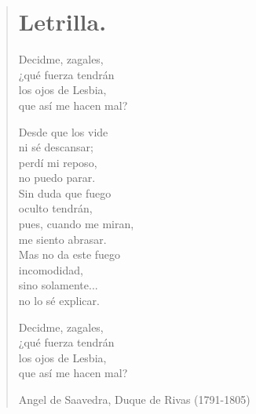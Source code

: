 \documentclass[12pt, twoside]{book}
\begin{document}
\newpage
\begin{verse}
\begin{center}
\section{Letrilla.}
\end{center}
Decidme, zagales,\\
¿qué fuerza tendrán\\
los ojos de Lesbia,\\
que así me hacen mal?
\newline

Desde que los vide\\
ni sé descansar;\\
perdí mi reposo,\\
no puedo parar.\\
Sin duda que fuego\\
oculto tendrán,\\
pues, cuando me miran,\\
me siento abrasar.\\
Mas no da este fuego \\
incomodidad,\\
sino solamente...\\
no lo sé explicar.
\newline

Decidme, zagales,\\
¿qué fuerza tendrán\\
los ojos de Lesbia,\\
que así me hacen mal?
\newline

Angel de Saavedra, Duque de Rivas (1791-1805)
\end{verse}
\end{document}
